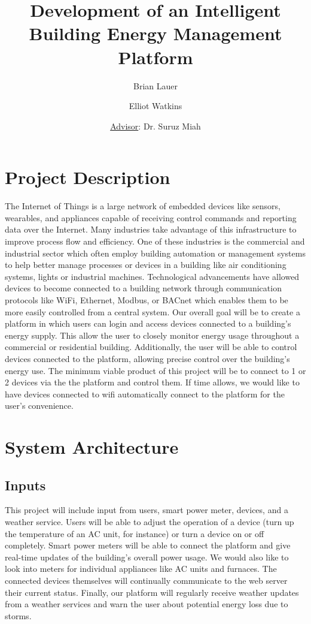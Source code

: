 \documentclass[12pt]{article} %
\title{Development of an Intelligent Building Energy Management Platform}
\author{Brian Lauer \and Elliot Watkins \and \underline{Advisor}: Dr. Suruz Miah
}
\begin{document}
\maketitle


\section{Project Description}
The Internet of Things is a large network of embedded devices like sensors, wearables, and appliances capable of receiving control commands and reporting data over the Internet. Many industries take advantage of this infrastructure to improve process flow and efficiency. One of these industries is the commercial and industrial sector which often employ building automation or management systems to help better manage processes or devices in a building like air conditioning systems, lights or industrial machines. Technological advancements have allowed devices to become connected to a building network through communication protocols like WiFi, Ethernet, Modbus, or BACnet which enables them to be more easily controlled from a central system.
\medbreak\noindent
Our overall goal will be to create a platform in which users can login and access devices connected to a building's energy supply. This allow the user to closely monitor energy usage throughout a commercial or residential building. Additionally, the user will be able to control devices connected to the platform, allowing precise control over the building's energy use.
\medbreak\noindent
The minimum viable product of this project will be to connect to 1 or 2 devices via the the platform and control them. If time allows, we would like to have devices connected to wifi automatically connect to the platform for the user's convenience.

\section{System Architecture}

\subsection{Inputs}
This project will include input from users, smart power meter, devices, and a weather service. Users will be able to adjust the operation of a device (turn up the temperature of an AC unit, for instance) or turn a device on or off completely. Smart power meters will be able to connect the platform and give real-time updates of the building's overall power usage. We would also like to look into meters for individual appliances like AC units and furnaces. The connected devices themselves will continually communicate to the web server their current status. Finally, our platform will regularly receive weather updates from a weather services and warn the user about potential energy loss due to storms.
\end{document}
